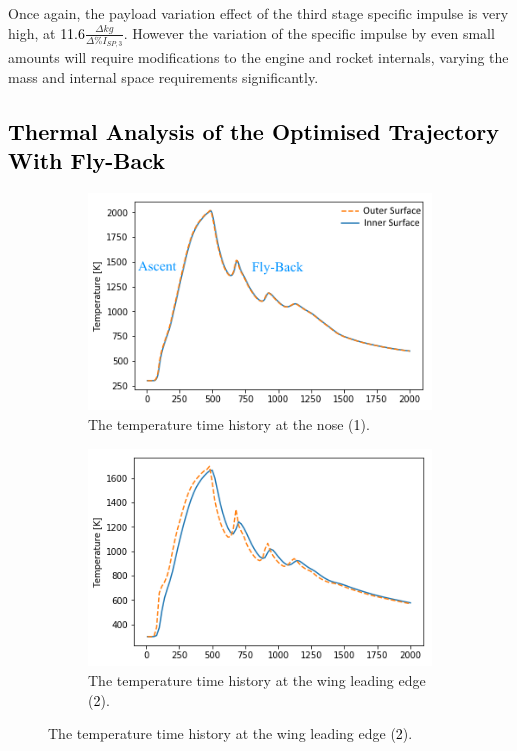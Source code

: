 Once again, the payload variation effect of the third stage specific impulse is very high, at \textcolor{black}{11.6}$\frac{\Delta kg}{\Delta\%I_{SP,3}}$. However the variation of the specific impulse by even small amounts will require modifications to the engine and rocket internals, varying the mass and internal space requirements significantly.



\textcolor{black}{
	\section{Thermal Analysis of the Optimised Trajectory With Fly-Back}\label{sec:therm3}
}
\begin{figure}[!ht]
	\begin{subfigure}{.5\textwidth}
		\centering
		\includegraphics[width=0.99\linewidth]{figures/A1_uncertainty-analysis/TNoseReturn}
		\caption{The temperature time history at the nose (\textcolor{black}{1}).}
		
	\end{subfigure}
	\begin{subfigure}{.5\textwidth}
		\centering
		\includegraphics[width=0.99\linewidth]{figures/A1_uncertainty-analysis/TLEReturn}
		\caption{The temperature time history at the wing leading edge (\textcolor{black}{2}).}
		

\end{subfigure}
\end{figure}
